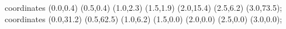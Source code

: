  coordinates {(0.0,0.4) (0.5,0.4) (1.0,2.3) (1.5,1.9) (2.0,15.4) (2.5,6.2) (3.0,73.5)};
 coordinates {(0.0,31.2) (0.5,62.5) (1.0,6.2) (1.5,0.0) (2.0,0.0) (2.5,0.0) (3.0,0.0)};
